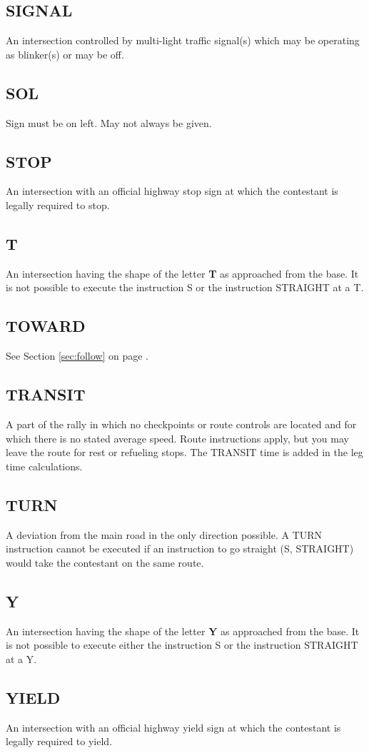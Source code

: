 \subsection{SIGNAL}
An intersection controlled by multi-light traffic signal(s) which may be operating as blinker(s) or may be off.

\subsection{SOL}
Sign must be on left.  May not always be given.

\subsection{STOP}
An intersection with an official highway stop sign at which the contestant is legally required to stop.

\subsection{T}
An intersection having the shape of the letter \textbf{T} as approached from the base.  It is not possible to execute the instruction S or the instruction STRAIGHT at a T.

\subsection{TOWARD}
See Section \ref{sec:follow} on page \pageref{sec:follow}.

\subsection{TRANSIT}
A part of the rally in which no checkpoints or route controls are located and for which there is no stated average speed.  Route instructions apply, but you may leave the route for rest or refueling stops.  The TRANSIT time is added in the leg time calculations.

\subsection{TURN}
A deviation from the main road in the only direction possible.  A TURN instruction cannot be executed if an instruction to go straight (S, STRAIGHT) would take the contestant on the same route.

\subsection{Y}
An intersection having the shape of the letter \textbf{Y} as approached from the base.  It is not possible to execute either the instruction S or the instruction STRAIGHT at a Y.

\subsection{YIELD}
An intersection with an official highway yield sign at which the contestant is legally required to yield.
